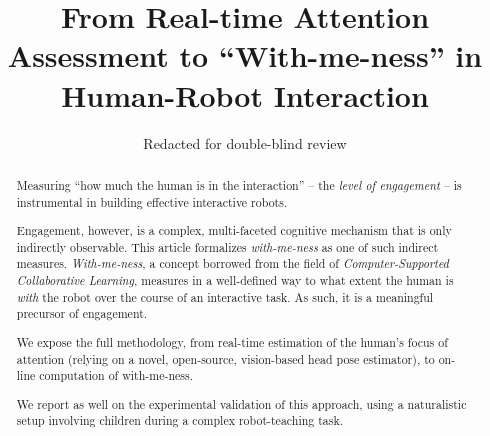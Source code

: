 \documentclass{sig-alternate}
\begin{document}
%

\title{From Real-time Attention Assessment to ``With-me-ness'' in Human-Robot Interaction}

\author{Redacted for double-blind review}


\maketitle
\begin{abstract}

Measuring ``how much the human is in the interaction'' -- the \emph{level of
engagement} -- is instrumental in building effective interactive robots.

Engagement, however, is a complex, multi-faceted cognitive mechanism that is
only indirectly observable. This article formalizes \emph{with-me-ness} as one
of such indirect measures. \emph{With-me-ness}, a concept borrowed from the
field of {\it Computer-Supported Collaborative Learning}, measures in a
well-defined way to what extent the human is \emph{with} the robot over the
course of an interactive task. As such, it is a meaningful precursor of
engagement.

We expose the full methodology, from real-time estimation of the human's focus
of attention (relying on a novel, open-source, vision-based head pose
estimator), to on-line computation of with-me-ness.

We report as well on the experimental validation of this approach, using a
naturalistic setup involving children during a complex robot-teaching task.

\end{abstract}

\end{document}
